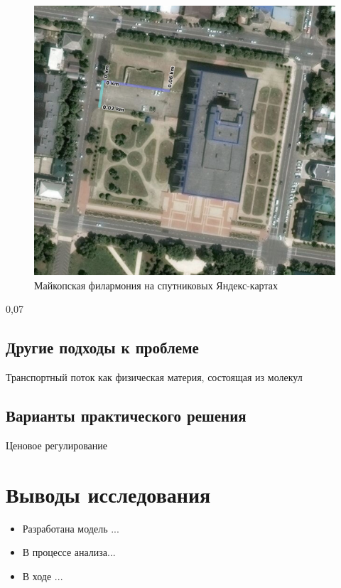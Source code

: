 \begin{figure}
	\includegraphics[scale=0.3]{img/filarmony_parking}
	\caption{Майкопская филармония на спутниковых Яндекс-картах}
\end{figure}

0,07





\section{Другие подходы к проблеме}
Транспортный поток как физическая материя, состоящая из молекул \cite[168]{lukanin}
\section{Варианты практического решения}
Ценовое регулирование




\chapter{Выводы исследования}

\begin{itemize}
	\item Разработана модель ...
	\item В процессе анализа...
	\item В ходе ...
\end{itemize}
